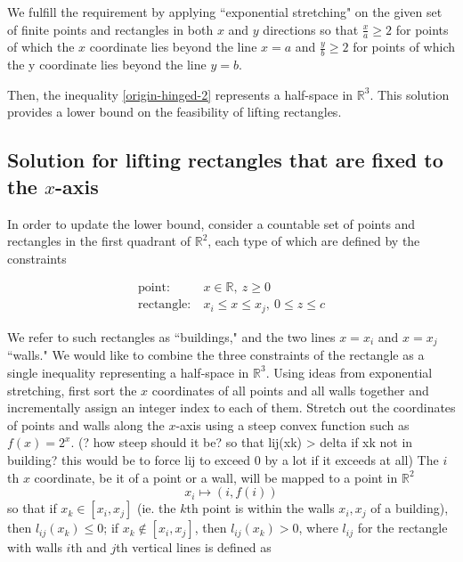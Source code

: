\documentclass{NSF}
\begin{document}
We fulfill the requirement by applying ``exponential stretching" on the given set of finite points and rectangles in both $x$ and $y$ directions so that $\frac{x}{a} \geq 2$  for points of which the $x$ coordinate lies beyond the line $x=a$ and $\frac{y}{b} \geq 2$ for points of which the y coordinate lies beyond the line $y=b$. 

Then, the inequality \eqref{origin-hinged-2} represents a half-space in $\mathbb{R}^3$. This solution provides a lower bound on the feasibility of lifting rectangles.



\subsection{Solution for lifting rectangles that are fixed to the $x$-axis}

In order to update the lower bound, consider a countable set of points and rectangles in the first quadrant of $\mathbb{R}^2$, each type of which are defined by the constraints

\begin{align*}
    \text{point:}& \ x \in \mathbb{R},\  z \geq 0 \\
    \text{rectangle:}& \ x_i \leq x \leq x_j,\ 0 \leq z \leq c
\end{align*}

We refer to such rectangles as ``buildings," and the two lines $x=x_i$ and $x=x_j$ ``walls."
We would like to combine the three constraints of the rectangle as a single inequality representing a half-space in $\mathbb{R}^3$.
Using ideas from exponential stretching, first sort the $x$ coordinates of all points and all walls together and incrementally assign an integer index to each of them. Stretch out the coordinates of points and walls along the $x$-axis using a steep convex function such as $f(x)=2^x$. 
(? how steep should it be? so that lij(xk) > delta if xk not in building? this would be to force lij to exceed 0 by a lot if it exceeds at all)
The $i$th $x$ coordinate, be it of a point or a wall, will be mapped to a point in $\mathbb{R}^2$
\begin{equation*}
	x_i \mapsto (i, f(i))
\end{equation*}
so that if $x_k \in [x_i,x_j]$ (ie. the $k$th point is within the walls $x_i,x_j$ of a building), then $l_{ij}(x_k) \leq 0 $; if $x_k \notin [x_i,x_j]$, then $l_{ij}(x_k) > 0$, where $l_{ij}$ for the rectangle with walls  $i$th and $j$th vertical lines is defined as
\end{document}
